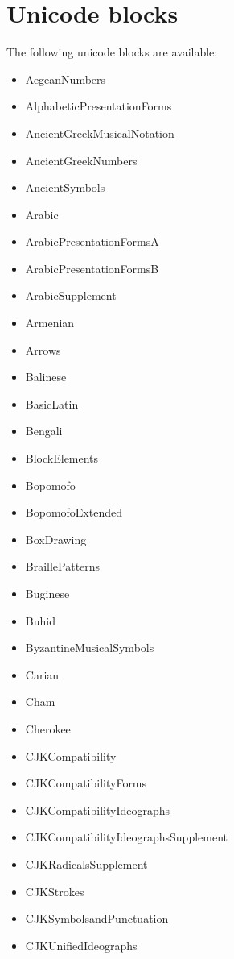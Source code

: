 ﻿\documentclass{article}
\newenvironment{itemlist}{%
  \begin{itemize}
	\setlength{\itemsep}{0pt}
	\setlength{\parsep}{0pt}
	\setlength{\topsep}{0pt}
	\setlength{\partopsep}{0pt}
	\setlength{\parskip}{0pt}
	\setlength{\labelsep}{5pt}}%
{
  \end{itemize}}
\begin{document}
	\section{Unicode blocks}
	
		The following unicode blocks are available:
		
		\begin{multicols}{2}
			\begin{itemlist}
				\item AegeanNumbers
				\item AlphabeticPresentationForms
				\item AncientGreekMusicalNotation
				\item AncientGreekNumbers
				\item AncientSymbols
				\item Arabic
				\item ArabicPresentationFormsA
				\item ArabicPresentationFormsB
				\item ArabicSupplement
				\item Armenian
				\item Arrows
				\item Balinese
				\item BasicLatin
				\item Bengali
				\item BlockElements
				\item Bopomofo
				\item BopomofoExtended
				\item BoxDrawing
				\item BraillePatterns
				\item Buginese
				\item Buhid
				\item ByzantineMusicalSymbols
				\item Carian
				\item Cham
				\item Cherokee
				\item CJKCompatibility
				\item CJKCompatibilityForms
				\item CJKCompatibilityIdeographs
				\item CJKCompatibilityIdeographsSupplement
				\item CJKRadicalsSupplement
				\item CJKStrokes
				\item CJKSymbolsandPunctuation
				\item CJKUnifiedIdeographs

\end{itemlist}
\end{multicols}
\end{document}
